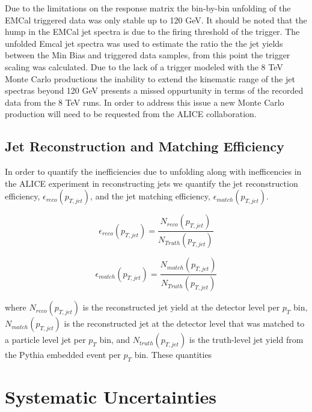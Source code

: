 \noindent
Due to the limitations on the response matrix the bin-by-bin unfolding of the EMCal triggered data was only stable up to 120 GeV.  It should be noted that the hump in the EMCal jet spectra is due to the firing threshold of the trigger.  The unfolded Emcal jet spectra was used to estimate the ratio the the jet yields between the Min Bias and triggered data samples, from this point the trigger scaling was calculated.  Due to the lack of a trigger modeled with the 8 TeV Monte Carlo productions the inability to extend the kinematic range of the jet spectras beyond 120 GeV presents a missed oppurtunity in terms of the recorded data from the 8 TeV runs.  In order to address this issue a new Monte Carlo production will need to be requested from the ALICE collaboration.

\subsection{Jet Reconstruction and Matching Efficiency}
In order to quantify the inefficiencies due to unfolding along with inefficencies in the ALICE experiment in reconstructing jets we quantify the jet reconstruction efficiency, $\epsilon_{reco} (p_{T, jet})$, and the jet matching efficiency, $\epsilon_{match} (p_{T, jet})$.

\begin{equation}
 \epsilon_{reco} (p_{T, jet}) = \frac{N_{reco}(p_{T, jet}) }{N_{Truth} (p_{T, jet})}
\label{eq:jetrecoeff}
\end{equation}

\begin{equation}
 \epsilon_{match} (p_{T, jet}) = \frac{N_{match}(p_{T, jet}) }{N_{Truth}(p_{T, jet})}
\label{eq:jetmatchoeff}
\end{equation}

\noindent 
where $N_{reco} (p_{T, jet})$ is the reconstructed jet yield at the detector level per $p_{T}$ bin, $N_{match}(p_{T, jet})$ is the reconstructed jet at the detector level that was matched to a particle level jet per $p_{T}$ bin, and $N_{truth} (p_{T, jet})$ is the truth-level jet yield from the Pythia embedded event per $p_{T}$ bin.  These quantities 

\section{Systematic Uncertainties}

